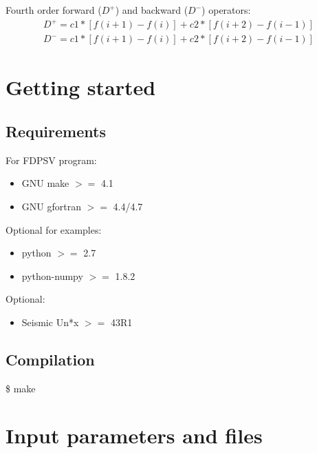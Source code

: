 \documentclass{smanual}
\newcommand{\addbash}[1]{
	\begin{center}
	\colorbox{bashgray}{\begin{minipage}{0.9\textwidth}
  	\ttfamily \$ #1
\end{minipage}}
	\end{center}
}
\begin{document}
\noindent Fourth order forward ($D^{+}$) and backward ($D^{-}$) operators:
\begin{eqnarray}
  D^{+}=c1*[f(i+1)-f(i)]+c2*[f(i+2)-f(i-1)] \nonumber \\
  D^{-}=c1*[f(i+1)-f(i)]+c2*[f(i+2)-f(i-1)]
\end{eqnarray}

\section{Getting started}

\subsection{Requirements}

\noindent For FDPSV program:
\begin{itemize}
	\item GNU make $>=$ 4.1
	\item GNU gfortran $>=$ 4.4/4.7
\end{itemize}

\noindent Optional for examples:
\begin{itemize}
	\item python $>=$ 2.7
	\item python-numpy $>=$ 1.8.2
\end{itemize}

\noindent Optional:
\begin{itemize}
	\item Seismic Un*x $>=$ 43R1
\end{itemize}

\subsection{Compilation}

\addbash{make}

\section{Input parameters and files}

\end{document}

